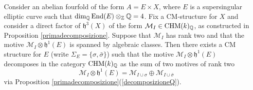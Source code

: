 \documentclass[11pt]{amsart}
\begin{document}
\begin{lemma}\label{bellaidea}
Consider an abelian fourfold of the form $ A=E\times X$, where  $E$ is a supersingular elliptic curve such that $\dim_{\mathbb{Q}}\textnormal{End}(E)\otimes_{\mathbb{Z}} \mathbb{Q}=4$. Fix a CM-structure for $X$ and consider a direct factor of $\mathfrak{h}^3(X)$  of the form $\mathcal{M}_{I} \in\mathrm{CHM} (k)_{\mathbb{Q}}$, as constructed in Proposition \ref{primadecomposizione}. Suppose that $\mathcal{M}_{I} $ has rank two and that  the  motive ${\mathcal{M}_I \otimes \mathfrak{h}^1(E)}$ is spanned by algebraic classes. Then  there exists a CM structure for  $E$ (write $\Sigma_E=\{\sigma,\bar{\sigma}\}$) such that  the motive $\mathcal{M}_I \otimes \mathfrak{h}^1(E)$ decomposes in the category $\mathrm{CHM} (k)_{\mathbb{Q}}$ as the sum of two motives of rank two 
\[\mathcal{M}_I \otimes \mathfrak{h}^1(E)= \mathcal{M}_{I\cup \sigma} \oplus \mathcal{M}_{I\cup \bar{\sigma}}\]
via Proposition  \ref{primadecomposizione}(\ref{decomposizioneQ}).
 \end{lemma}
\end{document}
